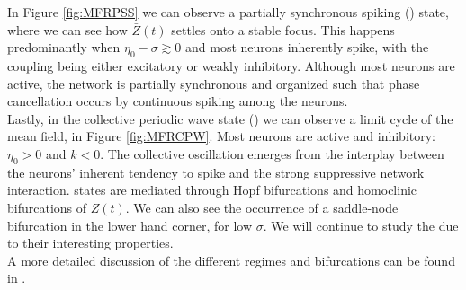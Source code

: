 In Figure \ref{fig:MFRPSS} we can observe a partially synchronous spiking (\PSS) state, where we can see how $\bar{Z}(t)$ settles onto a stable focus. This happens predominantly when $\eta_0 - \sigma \gtrsim 0$ and most neurons inherently spike, with the coupling being either excitatory or weakly inhibitory. Although most neurons are active, the network is partially synchronous and organized such that phase cancellation occurs by continuous spiking among the neurons.\\

Lastly, in the collective periodic wave state (\CPW) we can observe a limit cycle of the mean field, in Figure \ref{fig:MFRCPW}. Most neurons are active and inhibitory: $\eta_0 > 0$ and $k < 0$. The collective oscillation emerges from the interplay between the neurons’ inherent tendency to spike and the strong suppressive network interaction. \CPW states are mediated through Hopf bifurcations and homoclinic bifurcations of $Z(t)$. We can also see the occurrence of a saddle-node bifurcation in the lower hand corner, for low $\sigma$. We will continue to study the \CPW due to their interesting properties.\\

A more detailed discussion of the different regimes and bifurcations can be found in \cite{Luke2013}.


